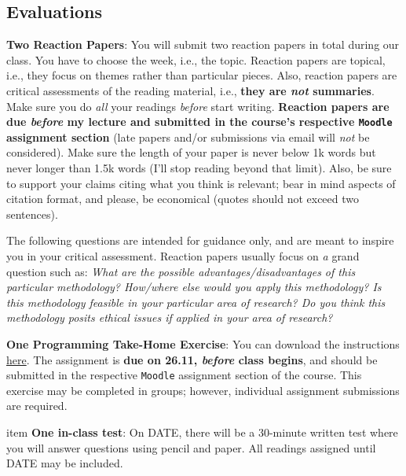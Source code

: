 \documentclass[letterpaper]{article}
\renewenvironment{itemize}{
  \begin{list}{}{
    \setlength{\leftmargin}{1.5em}
  }
}{
  \end{list}
}
\begin{document}
\subsection*{Evaluations}

\begin{enumerate}
  \item {\bf Two Reaction Papers}: You will submit two reaction papers in total during our class. You have to choose the week, i.e., the topic. Reaction papers are topical, i.e., they focus on themes rather than particular pieces. Also, reaction papers are critical assessments of the reading material, i.e., {\bf they are \emph{not} summaries}. Make sure you do \emph{all} your readings \emph{before} start writing. {\bf Reaction papers are due \emph{before} my lecture and submitted in the course's respective \texttt{Moodle} assignment section} (late papers and/or submissions via email will \emph{not} be considered). Make sure the length of your paper is never below 1k words but never longer than 1.5k words (I'll stop reading beyond that limit). Also, be sure to support your claims citing what you think is relevant; bear in mind aspects of citation format, and please, be economical (quotes should not exceed two sentences).

  \begin{itemize}
  \item[\Pointinghand] The following questions are intended for guidance only, and are meant to inspire you in your critical assessment. Reaction papers usually focus on \emph{a} grand question such as: \emph{What are the possible advantages/disadvantages of this particular methodology? How/where else would you apply this methodology? Is this methodology feasible in your particular area of research? Do you think this methodology posits ethical issues if applied in your area of research?}
\end{itemize}

\item {\bf One Programming Take-Home Exercise}: You can download the instructions \href{https://github.com/hbahamonde/Exp_Soc_Science/raw/main/Lectures/Labs/Conjoint/Conjoint_Lab.pdf}{here}. The assignment is {\bf due on 26.11, \emph{before} class begins}, and should be submitted in the respective \texttt{Moodle} assignment section of the course. This exercise may be completed in groups; however, individual assignment submissions are required.

item {\bf One in-class test}: On {\color{red}DATE}, there will be a 30-minute written test where you will answer questions using pencil and paper. All readings assigned until {\color{red}DATE} may be included.



\end{enumerate}
\end{document}
